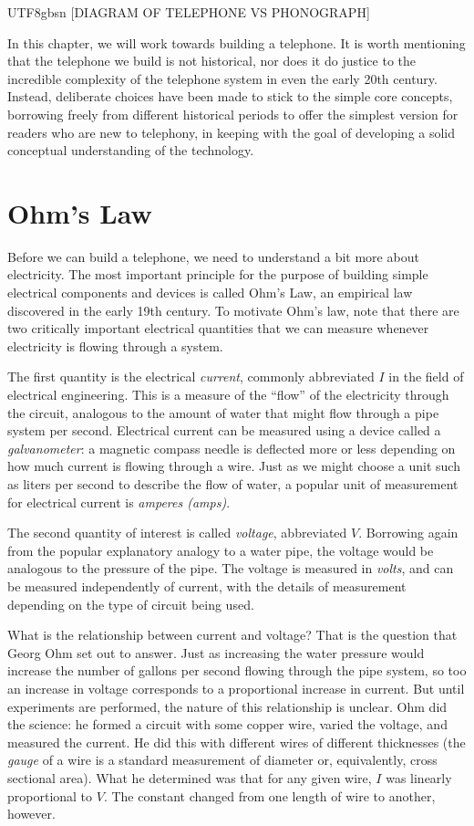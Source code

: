 \documentclass[UTF8]{book}
\begin{document}
\begin{CJK}{UTF8}{gbsn}
[DIAGRAM OF TELEPHONE VS PHONOGRAPH]

In this chapter, we will work towards building a telephone. It is worth mentioning that the telephone we build is not historical, nor does it do justice to the incredible complexity of the telephone system in even the early 20th century. Instead, deliberate choices have been made to stick to the simple core concepts, borrowing freely from different historical periods to offer the simplest version for readers who are new to telephony, in keeping with the goal of developing a solid conceptual understanding of the technology.

\section{Ohm's Law}

Before we can build a telephone, we need to understand a bit more about electricity. The most important principle for the purpose of building simple electrical components and devices is called Ohm's Law, an empirical law discovered in the early 19th century. To motivate Ohm's law, note that there are two critically important electrical quantities that we can measure whenever electricity is flowing through a system.

The first quantity is the electrical \emph{current}, commonly abbreviated $I$ in the field of electrical engineering. This is a measure of the ``flow'' of the electricity through the circuit, analogous to the amount of water that might flow through a pipe system per second. Electrical current can be measured using a device called a \emph{galvanometer}: a magnetic compass needle is deflected more or less depending on how much current is flowing through a wire. Just as we might choose a unit such as liters per second to describe the flow of water, a popular unit of measurement for electrical current is \emph{amperes (amps)}.

The second quantity of interest is called \emph{voltage}, abbreviated $V$. Borrowing again from the popular explanatory analogy to a water pipe, the voltage would be analogous to the pressure of the pipe. The voltage is measured in \emph{volts}, and can be measured independently of current, with the details of measurement depending on the type of circuit being used.

What is the relationship between current and voltage? That is the question that Georg Ohm set out to answer. Just as increasing the water pressure would increase the number of gallons per second flowing through the pipe system, so too an increase in voltage corresponds to a proportional increase in current. But until experiments are performed, the nature of this relationship is unclear. Ohm did the science: he formed a circuit with some copper wire, varied the voltage, and measured the current. He did this with different wires of different thicknesses (the \emph{gauge} of a wire is a standard measurement of diameter or, equivalently, cross sectional area). What he determined was that for any given wire, $I$ was linearly proportional to $V$. The constant changed from one length of wire to another, however.


\end{CJK}
\end{document}
